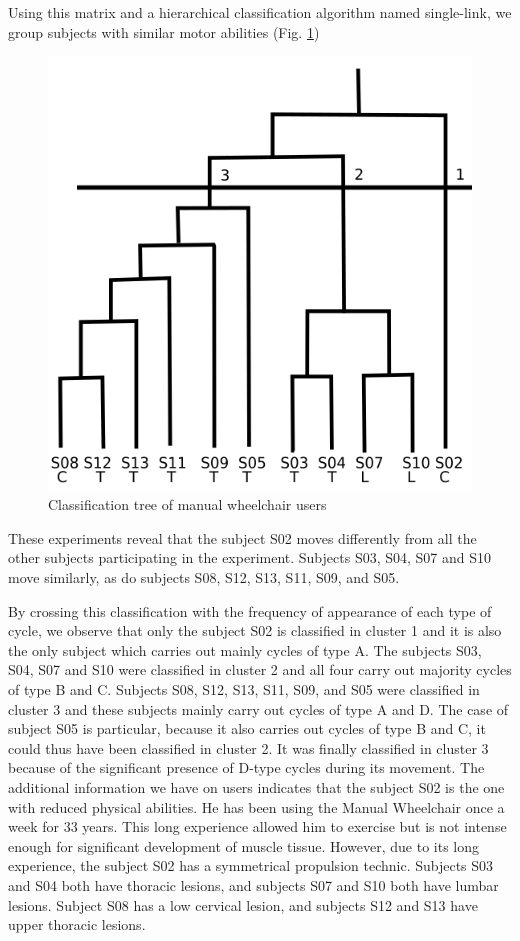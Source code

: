 Using this matrix and a hierarchical classification algorithm named single-link, we group subjects with similar motor abilities (Fig. \ref{classification_tree})

\begin{figure}[h]
\center
\includegraphics[scale = 0.6]{images/histogramme_sujets_frm}
\caption{Classification tree of manual wheelchair users}
\label{classification_tree}
\end{figure}

These experiments reveal that the subject S02 moves differently from all the other subjects participating in the experiment. Subjects S03, S04, S07 and S10 move similarly, as do subjects S08, S12, S13, S11, S09, and S05.


By crossing this classification with the frequency of appearance of each type of cycle, we observe that only the subject S02 is classified in cluster 1 and it is also the only subject which carries out mainly cycles of type A. The subjects S03, S04, S07 and S10 were classified in cluster 2 and all four carry out majority cycles of type B and C. Subjects S08, S12, S13, S11, S09, and S05 were classified in cluster 3 and these subjects mainly carry out cycles of type A and D. The case of subject S05 is particular, because it also carries out cycles of type B and C, it could thus have been classified in cluster 2. It was finally classified in cluster 3 because of the significant presence of D-type cycles during its movement. The additional information we have on users indicates that the subject S02 is the one with reduced physical abilities. He has been using the Manual Wheelchair once a week for 33 years. This long  experience allowed him to exercise but is not intense enough for significant development of muscle tissue. However, due to its long experience, the subject S02 has a symmetrical propulsion technic. Subjects S03 and S04 both have thoracic lesions, and subjects S07 and S10 both have lumbar lesions. Subject S08 has a low cervical lesion, and subjects S12 and S13 have upper thoracic lesions. 


